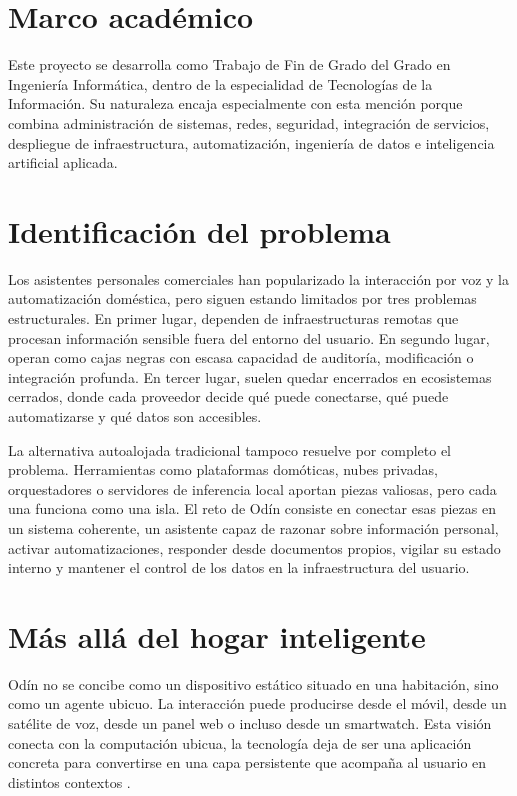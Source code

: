 \section{Marco académico}
Este proyecto se desarrolla como Trabajo de Fin de Grado del Grado en Ingeniería Informática, dentro de la especialidad de Tecnologías de la Información. Su naturaleza encaja especialmente con esta mención porque combina administración de sistemas, redes, seguridad, integración de servicios, despliegue de infraestructura, automatización, ingeniería de datos e inteligencia artificial aplicada.

\section{Identificación del problema}
Los asistentes personales comerciales han popularizado la interacción por voz y la automatización doméstica, pero siguen estando limitados por tres problemas estructurales. En primer lugar, dependen de infraestructuras remotas que procesan información sensible fuera del entorno del usuario. En segundo lugar, operan como cajas negras con escasa capacidad de auditoría, modificación o integración profunda. En tercer lugar, suelen quedar encerrados en ecosistemas cerrados, donde cada proveedor decide qué puede conectarse, qué puede automatizarse y qué datos son accesibles.

La alternativa autoalojada tradicional tampoco resuelve por completo el problema. Herramientas como plataformas domóticas, nubes privadas, orquestadores o servidores de inferencia local aportan piezas valiosas, pero cada una funciona como una isla. El reto de Odín consiste en conectar esas piezas en un sistema coherente, un asistente capaz de razonar sobre información personal, activar automatizaciones, responder desde documentos propios, vigilar su estado interno y mantener el control de los datos en la infraestructura del usuario.

\section{Más allá del hogar inteligente}
Odín no se concibe como un dispositivo estático situado en una habitación, sino como un agente ubicuo. La interacción puede producirse desde el móvil, desde un satélite de voz, desde un panel web o incluso desde un smartwatch. Esta visión conecta con la computación ubicua, la tecnología deja de ser una aplicación concreta para convertirse en una capa persistente que acompaña al usuario en distintos contextos \cite{weiser1991computer}.

